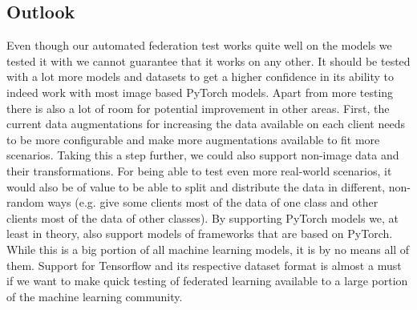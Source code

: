 \subsection{Outlook}
Even though our automated federation test works quite well on the models we tested it with we cannot guarantee that it works on any other. It should be tested with a lot more models and datasets to get a higher confidence in its ability to indeed work with most image based PyTorch models.  
Apart from more testing there is also a lot of room for potential improvement in other areas. First, the current data augmentations for increasing the data available on each client needs to be more configurable and make more augmentations available to fit more scenarios. Taking this a step further, we could also support non-image data and their transformations. For being able to test even more real-world scenarios, it would also be of value to be able to split and distribute the data in different, non-random ways (e.g. give some clients most of the data of one class and other clients most of the data of other classes).
By supporting PyTorch models we, at least in theory, also support models of frameworks that are based on PyTorch. While this is a big portion of all machine learning models, it is by no means all of them. Support for Tensorflow and its respective dataset format is almost a must if we want to make quick testing of federated learning available to a large portion of the machine learning community.
